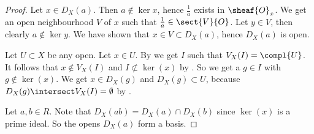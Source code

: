 \begin{proof}
Let $x\in D_X(a)$. Then $a\not\in\ker{x}$, hence $\frac{1}{a}$ exists in $\sheaf{O}_x$.
We get an open neighbourhood $V$ of $x$ such that $\frac{1}{a} \in \sect{V}{O}$.
Let $y\in V$, then clearly $a\not\in\ker{y}$. We have shown that $x\in V\subset D_X(a)$,
hence $D_X(a)$ is open.

Let $U\subset X$ be any open. Let $x\in U$.
By  we get $I$ such that $V_X(I) = \compl{U}$.
It follows that $x\not\in V_X(I)$ and $I\not\subset \ker(x)$ by .
So we get a $g\in I$ with $g\not\in \ker(x)$.
We get $x\in D_X(g)$ and $D_X(g) \subset U$, because $D_X(g) \intersect V_X(I) = \emptyset$
by .

Let $a,b\in R$.
Note that $D_X(ab) = D_X(a) \cap D_X(b)$ since $\ker(x)$ is a prime ideal.
So the opens $D_X(a)$ form a basis.
\end{proof}